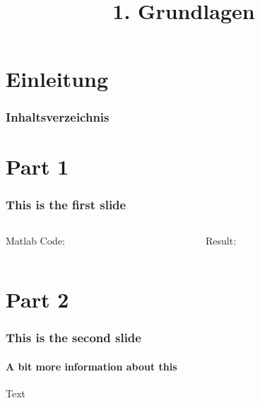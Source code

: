 

\title{\\{\scriptsize 1. Grundlagen}}


    

    \section{Einleitung}
    \begin{frame}
        \frametitle{Inhaltsverzeichnis}
        \tableofcontents[currentsection]
    \end{frame}

    \section{Part 1}
    \begin{frame}
        \frametitle{This is the first slide}
        \begin{columns}[t]
          \begin{column}{5cm}
            \begin{exampleblock}{Matlab Code:}
              
            \end{exampleblock}
          \end{column}
          \begin{column}{5cm}
            \begin{block}{Result:}
              
            \end{block}
          \end{column}
        \end{columns}

    \end{frame}

    \section{Part 2}
    \begin{frame}
        \frametitle{This is the second slide}
        \framesubtitle{A bit more information about this}
        Text
    \end{frame}

